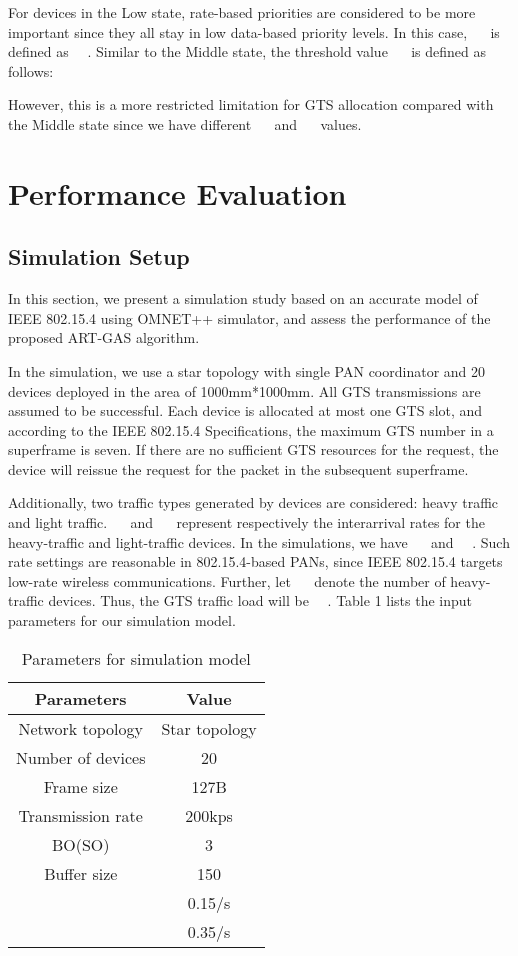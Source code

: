 \documentclass[letterpaper]{sig-alternate-10pt}
\begin{document}
For devices in the Low state, rate-based priorities are considered to be more important since they all stay in low data-based priority levels. In this case, ~~ is defined as ~~. Similar to the Middle state, the threshold value ~~ is defined as follows:



However, this is a more restricted limitation for GTS allocation compared with the Middle state since we have different ~~ and ~~ values.

\section{Performance Evaluation}
\subsection{Simulation Setup}
In this section, we present a simulation study based on an accurate model of IEEE 802.15.4 using OMNET++ simulator, and assess the performance of the proposed ART-GAS algorithm.

In the simulation, we use a star topology with single PAN coordinator and 20 devices deployed in the area of 1000mm*1000mm. All GTS transmissions are assumed to be successful. Each device is allocated at most one GTS slot, and according to the IEEE 802.15.4 Specifications, the maximum GTS number in a superframe is seven. If there are no sufficient GTS resources for the request, the device will reissue the request for the packet in the subsequent superframe.

Additionally, two traffic types generated by devices are considered: heavy traffic and light traffic. ~~ and ~~ represent respectively the interarrival rates for the heavy-traffic and light-traffic devices. In the simulations, we have ~~ and ~~. Such rate settings are reasonable in 802.15.4-based PANs, since IEEE 802.15.4 targets low-rate wireless communications. Further, let ~~ denote the number of heavy-traffic devices. Thus, the GTS traffic load will be ~~. Table 1 lists the input parameters for our simulation model.

\begin{table}[!t]\setlength{\abovecaptionskip}{0pt}
\setlength{\belowcaptionskip}{5pt}
\renewcommand{\captionfont}{\bfseries}
\centering
\caption{Parameters for simulation model}
\begin{tabular}{|c|c|}\hline Parameters    &   Value    \\
\hline
Network topology&Star topology\\
\cline{1-2}
Number of devices&20\\
\cline{1-2}
Frame size&127B\\
\cline{1-2}
Transmission rate&200kps\\
\cline{1-2}
BO(SO)&3\\
\cline{1-2}
Buffer size&150\\
\cline{1-2}
~~&0.15/s\\
\cline{1-2}
~~&0.35/s\\
\hline
\end{tabular}
\end{table}
\end{document}
